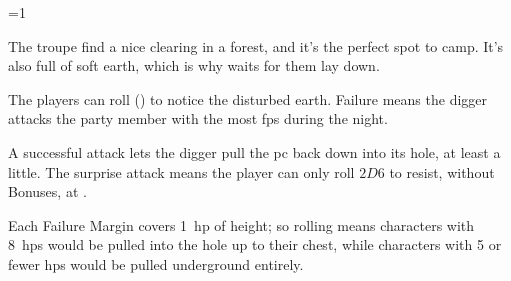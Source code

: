 \ifnum\value{temperature}=1

The troupe find a nice clearing in a forest, and it's the perfect spot to camp.
It's also full of soft earth, which is why  waits for them lay down.

The players can roll  (\tn[10]) to notice the disturbed earth.
Failure means the \gls{digger} attacks the party member with the most \glspl{fp} during the night.

\mouthdigger

\addtocounter{tn}{\value{Brawl}}
\addtocounter{tn}{2}

A successful attack lets the \gls{digger} pull the \gls{pc} back down into its hole, at least a little.
The surprise attack means the player can only roll $2D6$ to resist, without Bonuses, at \tn.
\addtocounter{tn}{-5}
Each Failure Margin covers 1~\gls{hp} of height; so rolling  means characters with 8~\glspl{hp} would be pulled into the hole up to their chest, while characters with 5 or fewer \glspl{hp} would be pulled underground entirely.

\fi
